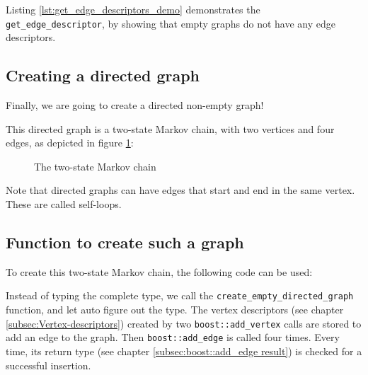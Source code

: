 Listing \ref{lst:get_edge_descriptors_demo}
demonstrates the \verb;get_edge_descriptor;, by showing that empty graphs do
not have any edge descriptors.



\subsection{Creating a directed graph}
\label{subsec:create_markov_chain_graph}

Finally, we are going to create a directed non-empty graph! 

This directed graph is a two-state Markov chain, with two vertices and four
edges, as depicted in figure \ref{fig:markov_chain}:

\begin{figure}
  \caption{The two-state Markov chain}
  \label{fig:markov_chain}
\end{figure}

Note that directed graphs can have edges that start and end in the same
vertex.
These are called self-loops.

\subsection{Function to create such a graph}

To create this two-state Markov chain, the following code can be used:



Instead of typing the complete type, 
we call the \verb;create_empty_directed_graph;
function, and let auto figure out the type.
The vertex descriptors (see chapter \ref{subsec:Vertex-descriptors}) 
created by two \verb;boost::add_vertex; 
calls are stored to add an edge to the graph.
Then \verb;boost::add_edge; 
is called four times.
Every time, its return type 
(see chapter \ref{subsec:boost::add_edge result}) 
is checked for a successful insertion.


